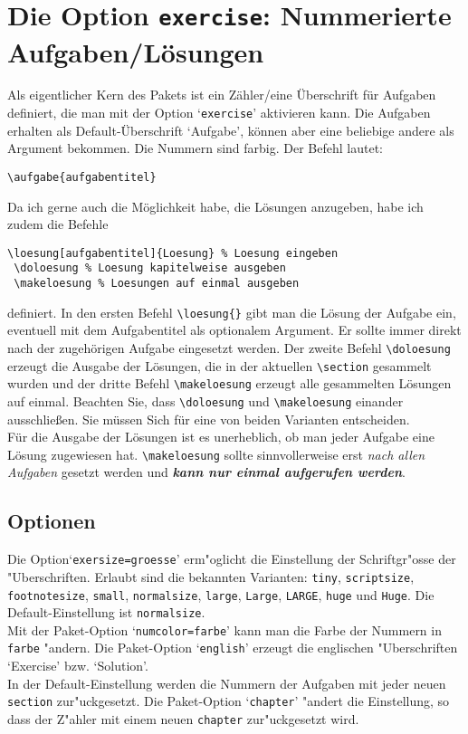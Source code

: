 \documentclass[a4paper,10pt,headsepline]{scrartcl}
\newcommand{\option}[1]{`\texttt{#1}'\xspace}
\begin{document}
\section[Aufgaben/L\"osungen]{Die Option \texttt{exercise}: Nummerierte Aufgaben/L\"osungen}\label{sec:aufgaben}
Als eigentlicher Kern des Pakets ist ein Z\"ahler/eine \"Uberschrift f\"ur Aufgaben definiert, die man mit der Option \option{exercise} aktivieren kann. Die Aufgaben erhalten als De\-fault-\"U\-ber\-schrift `Aufgabe', k\"onnen aber eine beliebige andere als Argument bekommen. Die Nummern sind farbig. Der Befehl lautet:
\begin{lstlisting}[numbers=none,basicstyle=\normalsize\ttfamily]
 \aufgabe{aufgabentitel}
\end{lstlisting}
Da ich gerne auch die M\"oglichkeit habe, die L\"osungen anzugeben, habe ich zudem die Befehle
\begin{lstlisting}[numbers=none,basicstyle=\normalsize\ttfamily]
 \loesung[aufgabentitel]{Loesung} % Loesung eingeben
 \doloesung % Loesung kapitelweise ausgeben
 \makeloesung % Loesungen auf einmal ausgeben
\end{lstlisting}
definiert. In den ersten Befehl \verb=\loesung{}= gibt man die L\"osung der Aufgabe ein, eventuell mit dem Aufgabentitel als optionalem Argument. Er sollte immer direkt nach der zugeh\"origen Aufgabe eingesetzt werden. Der zweite Befehl \verb=\doloesung= erzeugt die Ausgabe der L\"osungen, die in der aktuellen \verb=\section= gesammelt wurden und der dritte Befehl \verb=\makeloesung= erzeugt alle gesammelten L\"osungen auf einmal. Beachten Sie, dass \verb=\doloesung= und \verb=\makeloesung= einander ausschlie\ss{}en. Sie m\"ussen Sich f\"ur eine von beiden Varianten entscheiden.\\
F\"ur die Ausgabe der L\"osungen ist es unerheblich, ob man jeder Aufgabe eine L\"osung zugewiesen hat. \verb=\makeloesung= sollte sinnvollerweise erst \emph{nach allen Aufgaben} gesetzt werden und \emph{\textbf{kann nur einmal aufgerufen werden}}.

\subsection{Optionen}
Die Option\option{exersize=groesse} erm"oglicht die Einstellung der Schriftgr"osse der "Uberschriften. Erlaubt sind die bekannten Varianten: \texttt{tiny}, \texttt{scriptsize}, \texttt{footnotesize}, \texttt{small}, \texttt{normalsize}, \texttt{large}, \texttt{Large}, \texttt{LARGE}, \texttt{huge} und \texttt{Huge}. Die Default-Einstellung ist \texttt{normalsize}.\\
Mit der Paket-Option \option{numcolor=farbe} kann man die Farbe der Nummern in \texttt{farbe} "andern. Die Paket-Option \option{english} erzeugt die englischen "Uberschriften `Exercise' bzw. `Solution'.\\
In der Default-Einstellung werden die Nummern der Aufgaben mit jeder neuen \texttt{section} zur"uckgesetzt. Die Paket-Option \option{chapter} "andert die Einstellung, so dass der Z"ahler mit einem neuen \texttt{chapter} zur"uckgesetzt wird.
\end{document}
